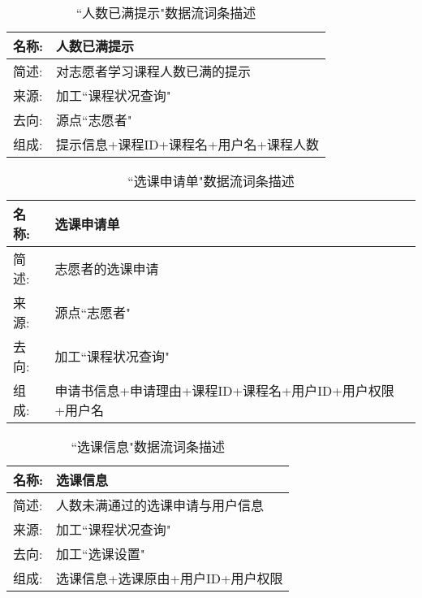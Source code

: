 \begin{table}[H]  
\caption{``人数已满提示"数据流词条描述}  
\begin{center}  
    \begin{tabular}{l p{11cm}} 
        \hline
        \quad 名称: & 人数已满提示 \\
        \hline
        \quad 简述: & 对志愿者学习课程人数已满的提示 \\
        \hline
        \quad 来源: & 加工``课程状况查询" \\
        \hline
        \quad 去向: & 源点``志愿者" \\
        \hline
        \quad 组成: & 提示信息+课程ID+课程名+用户名+课程人数 \\
        \hline
    \end{tabular}
    \label{tab1}
\end{center}
\end{table}

\begin{table}[H]  
\caption{``选课申请单"数据流词条描述}  
\begin{center}  
    \begin{tabular}{l p{11cm}} 
        \hline
        \quad 名称: & 选课申请单 \\
        \hline
        \quad 简述: & 志愿者的选课申请 \\
        \hline
        \quad 来源: & 源点``志愿者" \\
        \hline
        \quad 去向: & 加工``课程状况查询" \\
        \hline
        \quad 组成: & 申请书信息+申请理由+课程ID+课程名+用户ID+用户权限+用户名 \\
        \hline
    \end{tabular}
    \label{tab1}
\end{center}
\end{table}

\begin{table}[H]  
\caption{``选课信息"数据流词条描述}  
\begin{center}  
    \begin{tabular}{l p{11cm}} 
        \hline
        \quad 名称: & 选课信息 \\
        \hline
        \quad 简述: & 人数未满通过的选课申请与用户信息 \\
        \hline
        \quad 来源: & 加工``课程状况查询" \\
        \hline
        \quad 去向: & 加工``选课设置" \\
        \hline
        \quad 组成: & 选课信息+选课原由+用户ID+用户权限\\
        \hline
    \end{tabular}
    \label{tab1}
\end{center}
\end{table}



